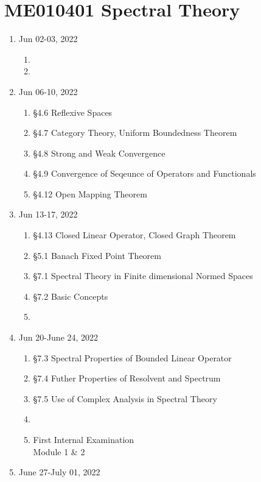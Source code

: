 \chapter{ME010401 Spectral Theory}
\begin{enumerate}[label=Week \arabic*]
	\item Jun 02-03, 2022
	\begin{enumerate}[label=Day \arabic*]
		\item 
		\item
	\end{enumerate}
	\item Jun 06-10, 2022 
	\begin{enumerate}[label=Day \arabic*]
		\item 
			\S4.6 Reflexive Spaces
		\item
			\S4.7 Category Theory, Uniform Boundedness Theorem
		\item 
			\S4.8 Strong and Weak Convergence
		\item 
			\S4.9 Convergence of Seqeunce of Operators and Functionals
		\item 
			\S4.12 Open Mapping Theorem
	\end{enumerate}
	\item Jun 13-17, 2022 
	\begin{enumerate}[label=Day \arabic*]
		\item 
			\S4.13 Closed Linear Operator, Closed Graph Theorem
		\item 
			\S5.1 Banach Fixed Point Theorem
		\item 
			\S7.1 Spectral Theory in Finite dimensional Normed Spaces
		\item 
			\S7.2 Basic Concepts
		\item 
	\end{enumerate}
	\item Jun 20-June 24, 2022 
	\begin{enumerate}[label=Day \arabic*]
		\item 
			\S7.3 Spectral Properties of Bounded Linear Operator
		\item 
			\S7.4 Futher Properties of Resolvent and Spectrum
		\item 
			\S7.5 Use of Complex Analysis in Spectral Theory
		\item 
		\item 
			First Internal Examination \\
			Module 1 \& 2
	\end{enumerate}
	\item June 27-July 01, 2022 

\end{enumerate}
